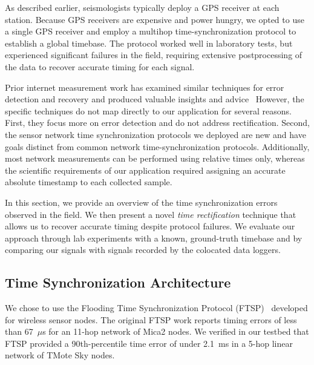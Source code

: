 As described earlier, seismologists typically deploy a GPS receiver at each
station. Because GPS receivers are expensive and power hungry, we opted to
use a single GPS receiver and employ a multihop time-synchronization protocol
to establish a global timebase. The protocol worked well in laboratory tests,
but experienced significant failures in the field, requiring extensive
postprocessing of the data to recover accurate timing for each signal.

Prior internet measurement work has examined similar techniques for error
detection and recovery and produced valuable insights and
advice~\cite{paxson98calibrating,1028824} However, the specific techniques do
not map directly to our application for several reasons. First, they focus
more on error detection and do not address rectification. Second, the sensor
network time synchronization protocols we deployed are new and have goals
distinct from common network time-synchronization protocols. Additionally,
most network measurements can be performed using relative times only, whereas
the scientific requirements of our application required assigning an accurate
absolute timestamp to each collected sample.

In this section, we provide an overview of the time synchronization errors
observed in the field. We then present a novel \textit{time rectification}
technique that allows us to recover accurate timing despite protocol
failures. We evaluate our approach through lab experiments with a known,
ground-truth timebase and by comparing our signals with signals recorded by
the colocated data loggers.

\subsection{Time Synchronization Architecture}

We chose to use the Flooding Time Synchronization Protocol (FTSP)~\cite{ftsp}
developed for wireless sensor nodes. The original FTSP work reports timing
errors of less than 67~$\mu$s for an 11-hop network of Mica2 nodes. We
verified in our testbed that FTSP provided a 90th-percentile time error of
under 2.1~ms in a 5-hop linear network of TMote Sky nodes.

